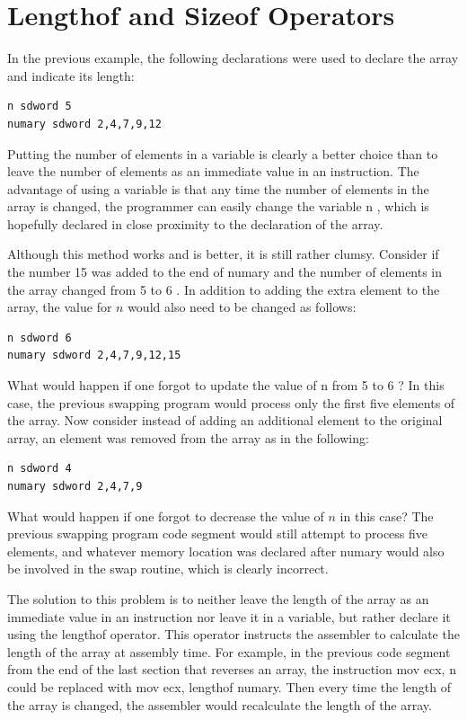 \documentclass[10pt]{book}
\begin{document}
\section{Lengthof and Sizeof Operators}
In the previous example, the following declarations were used to declare the array and indicate its length:

\begin{verbatim}
n sdword 5
numary sdword 2,4,7,9,12
\end{verbatim}

Putting the number of elements in a variable is clearly a better choice than to leave the number of elements as an immediate value in an instruction. The advantage of using a variable is that any time the number of elements in the array is changed, the programmer can easily change the variable n , which is hopefully declared in close proximity to the declaration of the array.

Although this method works and is better, it is still rather clumsy. Consider if the number 15 was added to the end of numary and the number of elements in the array changed from 5 to 6 . In addition to adding the extra element to the array, the value for $n$ would also need to be changed as follows:


\begin{verbatim}
n sdword 6
numary sdword 2,4,7,9,12,15
\end{verbatim}

What would happen if one forgot to update the value of n from 5 to 6 ? In this case, the previous swapping program would process only the first five elements of the array. Now consider instead of adding an additional element to the original array, an element was removed from the array as in the following:

\begin{verbatim}
n sdword 4
numary sdword 2,4,7,9
\end{verbatim}

What would happen if one forgot to decrease the value of $n$ in this case? The previous swapping program code segment would still attempt to process five elements, and whatever memory location was declared after numary would also be involved in the swap routine, which is clearly incorrect.

The solution to this problem is to neither leave the length of the array as an immediate value in an instruction nor leave it in a variable, but rather declare it using the lengthof operator. This operator instructs the assembler to calculate the length of the array at assembly time. For example, in the previous code segment from the end of the last section that reverses an array, the instruction mov ecx, n could be replaced with mov ecx, lengthof numary. Then every time the length of the array is changed, the assembler would recalculate the length of the array.
\end{document}
